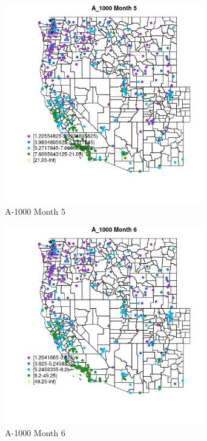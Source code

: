 \begin{figure} 
\centering  
\includegraphics[width=0.77\textwidth]{Code_Outputs/ML_input_report_ML_input_PM25_Step5_part_d_de_duplicated_aves_ML_input_MapObsMo5A_1000.jpg} 
\caption{\label{fig:ML_input_report_ML_input_PM25_Step5_part_d_de_duplicated_aves_ML_inputMapObsMo5A_1000}A-1000 Month 5} 
\end{figure} 
 

\begin{figure} 
\centering  
\includegraphics[width=0.77\textwidth]{Code_Outputs/ML_input_report_ML_input_PM25_Step5_part_d_de_duplicated_aves_ML_input_MapObsMo6A_1000.jpg} 
\caption{\label{fig:ML_input_report_ML_input_PM25_Step5_part_d_de_duplicated_aves_ML_inputMapObsMo6A_1000}A-1000 Month 6} 
\end{figure} 
 

